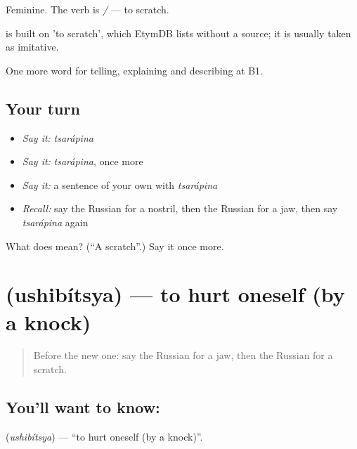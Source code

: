 Feminine. The verb is \emph{ / } — to scratch.

\begin{cousinweb}
\emph{} is built on \emph{} 'to scratch', which EtymDB lists without a source; it is usually taken as imitative.
\end{cousinweb}

\begin{grammarlens}[title={What you've built}]
One more word for telling, explaining and describing at B1.
\end{grammarlens}

\subsection*{Your turn}
\begin{itemize}
\raggedright
  \item \emph{Say it:} \emph{tsarápina}
  \item \emph{Say it:} \emph{tsarápina}, once more
  \item \emph{Say it:} a sentence of your own with \emph{tsarápina}
  \item \emph{Recall:} say the Russian for a nostril, then the Russian for a jaw, then say \emph{tsarápina} again
\end{itemize}

\begin{tcolorbox}[breakable,colback=teal!4,colframe=teal!35!black,title={Before you move on}]
What does  mean? (\textquotedblleft{}A scratch\textquotedblright{}.) Say it once more.
\end{tcolorbox}
\section[\texorpdfstring{\ru{ушибиться} (ushibítsya)}{ушибиться (ushibítsya)}]{ (ushibítsya) — to hurt oneself (by a knock)}

\label{lesson:RU-C483-ushibitsya}



\begin{quote}
Before the new one: say the Russian for a jaw, then the Russian for a scratch.
\end{quote}

\subsection*{You'll want to know: }
\textbf{} (\emph{ushibítsya}) — \textquotedblleft{}to hurt oneself (by a knock)\textquotedblright{}.

